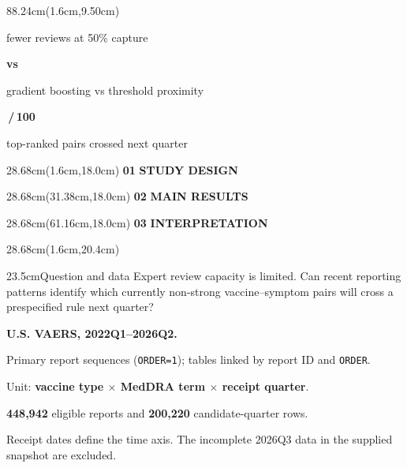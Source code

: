 \documentclass[12pt]{article}
\newcommand{\smallbody}{\fontsize{27}{35}\selectfont}
\newcommand{\labeltext}[1]{{\color{Blue}\bfseries #1}}
\newcommand{\spacepara}{\par\vspace{0.42cm}}
\newcommand{\bulletline}[1]{\par\noindent\hangindent=0.72cm\hangafter=1{\color{Teal}\textbullet}\hspace{0.35cm}#1\par\vspace{0.22cm}}
\newcommand{\colheading}[3]{%
\begin{textblock*}{28.68cm}(#1cm,18.0cm)
{\fontsize{24}{28}\selectfont\color{Teal}\bfseries #2}\hspace{0.42cm}%
{\fontsize{36}{42}\selectfont\color{Navy}\bfseries #3}
\end{textblock*}}
\begin{document}
\begin{textblock*}{88.24cm}(1.6cm,9.50cm)
\begin{tcolorbox}[enhanced,width=\linewidth,height=7.3cm,colback=white,colframe=Line,
boxrule=.7pt,arc=2.3mm,left=.8cm,right=.8cm,top=.35cm,bottom=.35cm,boxsep=0pt]
\begin{minipage}[c][6.2cm][c]{0.32\linewidth}
\centering
{\fontsize{76}{83}\selectfont\bfseries\color{Blue}\Reduction}\par\vspace{.12cm}
{\fontsize{29}{35}\selectfont fewer reviews at 50\% capture}
\end{minipage}\hfill
\begin{minipage}[c][6.2cm][c]{0.35\linewidth}
\centering
{\fontsize{60}{70}\selectfont\bfseries\color{Navy}\ReviewsGB\;\textcolor{Muted}{vs}\;\ReviewsBaseline}\par\vspace{.18cm}
{\fontsize{27}{34}\selectfont gradient boosting vs threshold proximity}
\end{minipage}\hfill
\begin{minipage}[c][6.2cm][c]{0.29\linewidth}
\centering
{\fontsize{76}{85}\selectfont\bfseries\color{Teal}\TopHundred\,/\,100}\par\vspace{.12cm}
{\fontsize{29}{35}\selectfont top-ranked pairs crossed next quarter}
\end{minipage}
\end{tcolorbox}
\end{textblock*}

\colheading{1.6}{01}{STUDY DESIGN}
\colheading{31.38}{02}{MAIN RESULTS}
\colheading{61.16}{03}{INTERPRETATION}

\begin{textblock*}{28.68cm}(1.6cm,20.4cm)
\begin{posterbox}{23.5cm}{Question and data}
Expert review capacity is limited. Can recent reporting patterns identify which
currently non-strong vaccine--symptom pairs will cross a prespecified rule next quarter?
\spacepara
\labeltext{U.S. VAERS, 2022Q1--2026Q2.}
\bulletline{Primary report sequences (\texttt{ORDER=1}); tables linked by report ID and \texttt{ORDER}.}
\bulletline{Unit: \textbf{vaccine type $\times$ MedDRA term $\times$ receipt quarter}.}
\bulletline{\textbf{448,942} eligible reports and \textbf{200,220} candidate-quarter rows.}
\vspace{0.15cm}
{\smallbody\color{Muted}Receipt dates define the time axis. The incomplete 2026Q3 data in the supplied snapshot are excluded.}
\end{posterbox}
\end{textblock*}
\end{document}
